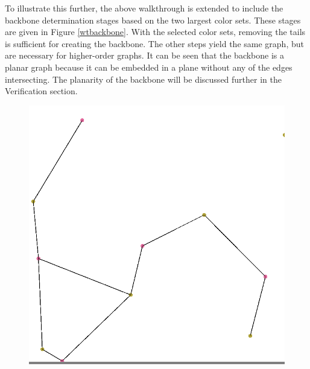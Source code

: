 \documentclass{article}
\begin{document}
        \par
        To illustrate this further, the above walkthrough is extended to include the backbone determination stages based on the two largest color sets. These stages are given in Figure \ref{wtbackbone}. With the selected color sets, removing the tails is sufficient for creating the backbone. The other steps yield the same graph, but are necessary for higher-order graphs. It can be seen that the backbone is a planar graph because it can be embedded in a plane without any of the edges intersecting. The planarity of the backbone will be discussed further in the Verification section.

        \begin{figure}
            \begin{minipage}{0.3\textwidth}
            \colorbox{gray}{\includegraphics[width=\linewidth]{./images/bipartite-wt.png}}
            \end{minipage}
            \hspace{\fill}
            \begin{minipage}{0.3\textwidth}

\end{minipage}
\end{figure}
\end{document}
